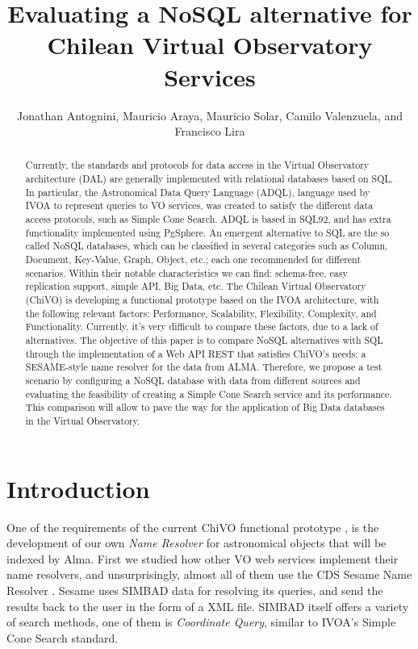 \documentclass[11pt,twoside]{article}
\begin{document}
\title{Evaluating a NoSQL alternative for Chilean Virtual Observatory Services}
\author{Jonathan Antognini,  Mauricio Araya, Mauricio Solar, Camilo Valenzuela, and  Francisco Lira
}

\begin{abstract}
Currently, the standards and protocols for data access in the Virtual Observatory architecture (DAL) are generally implemented with
relational databases based on SQL. In particular, the Astronomical Data Query Language (ADQL), language used by IVOA to represent 
queries to VO services, was created to satisfy the different data access protocols, such as Simple Cone Search. ADQL is based in 
SQL92, and has extra functionality implemented using PgSphere. An emergent alternative to SQL are the so called NoSQL databases, 
which can be classified in several categories such as Column, Document, Key-Value, Graph, Object, etc.; each one recommended for 
different scenarios. Within their notable characteristics we can find: schema-free, easy replication support, simple API, Big Data,
etc. The Chilean Virtual Observatory (ChiVO) is developing a functional prototype based on the IVOA architecture, with the following
relevant factors: Performance, Scalability, Flexibility, Complexity, and Functionality. Currently, it's very difficult to compare 
these factors, due to a lack of alternatives. The objective of this paper is to compare NoSQL alternatives with SQL through the 
implementation of a Web API REST that satisfies ChiVO's needs: a SESAME-style name resolver for the data from ALMA. Therefore, 
we propose a test scenario by configuring a NoSQL database with data from different sources and evaluating the feasibility of 
creating a Simple Cone Search service and its performance. This comparison will allow to pave the way for the application of 
Big Data databases in the Virtual Observatory.
\end{abstract}

\section{Introduction}
One of the requirements of the current ChiVO functional prototype
\cite{Antognini2013}, is the development of our own \emph{Name Resolver}
for astronomical objects that will be indexed by Alma. 
First we studied how other VO web services implement their name 
resolvers, and unsurprisingly, almost all of them use the CDS Sesame Name
Resolver \cite{}. 
Sesame uses SIMBAD data for resolving its queries, and send the results
back to the user in the form of a XML file.
SIMBAD itself offers a variety of search methods, one of them is
\emph{Coordinate Query}, similar to IVOA’s Simple Cone Search standard.
\end{document}
